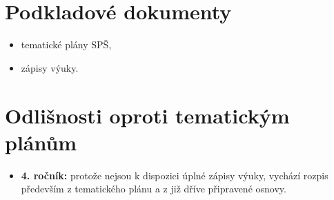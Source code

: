 \documentclass[10pt,a4paper]{article}
\begin{document}
\section*{Podkladové dokumenty}
\begin{itemize}\setlength{\itemsep}{2pt}
\item tematické plány SP\v{S},
\item zápisy výuky.
\end{itemize}

\section*{Odlišnosti oproti tematickým plánům}
\begin{itemize}\setlength{\itemsep}{2pt}
\item \textbf{4. ročník:} protože nejsou k dispozici úplné zápisy výuky, vychází rozpis především z tematického plánu a z již dříve připravené osnovy.
\end{itemize}
\clearpage
\end{document}
